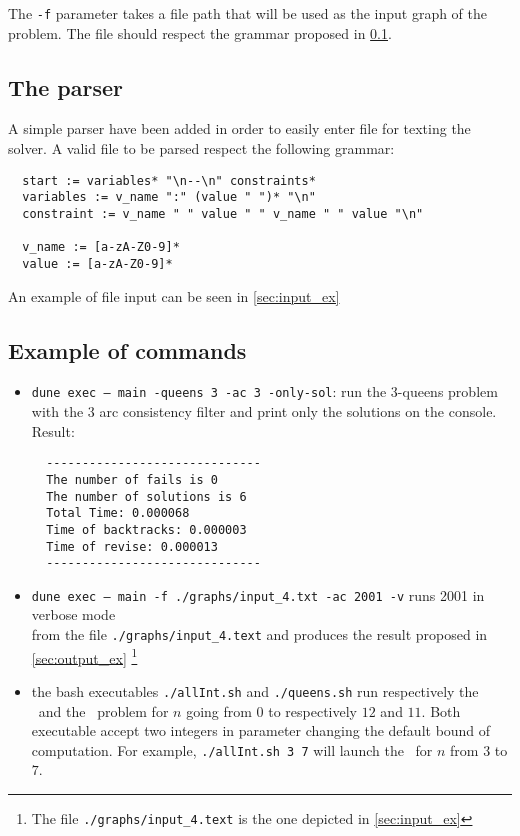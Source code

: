 \documentclass{rapport}
\begin{document}
The \texttt{-f} parameter takes a file path that will be used as the input graph of the problem. The file should respect the grammar proposed in \cref{sec:parser}.

\subsection{The parser}
\label{sec:parser}

A simple parser have been added in order to easily enter file for texting the solver. A valid file to be parsed respect the following grammar:

\begin{verbatim}
  start := variables* "\n--\n" constraints*
  variables := v_name ":" (value " ")* "\n"  
  constraint := v_name " " value " " v_name " " value "\n"

  v_name := [a-zA-Z0-9]*
  value := [a-zA-Z0-9]*
\end{verbatim}

An example of file input can be seen in \cref{sec:input_ex}


\subsection{Example of commands}

\begin{itemize}
  \item \texttt{dune exec -- main -queens 3 -ac 3 -only-sol}: run the 3-queens problem with the \ac{3} arc consistency filter and print only the solutions on the console. Result:\\
        \begin{verbatim}
  ------------------------------
  The number of fails is 0
  The number of solutions is 6
  Total Time: 0.000068
  Time of backtracks: 0.000003
  Time of revise: 0.000013
  ------------------------------
  \end{verbatim}

  \item \texttt{dune exec -- main -f ./graphs/input\_4.txt -ac 2001 -v} runs \ac{2001} in verbose mode \\ from the file \texttt{./graphs/input\_4.text} and produces the result proposed in \cref{sec:output_ex} \footnote{The file \texttt{./graphs/input\_4.text} is the one depicted in \cref{sec:input_ex}}

  \item the bash executables \texttt{./allInt.sh} and \texttt{./queens.sh} run respectively the \allint\ and the \queens\ problem for $n$ going from $0$ to respectively $12$ and $11$. Both executable accept two integers in parameter changing the default bound of computation. For example, \texttt{./allInt.sh 3 7} will launch the \allint\ for $n$ from $3$ to $7$.

\end{itemize}
\end{document}
